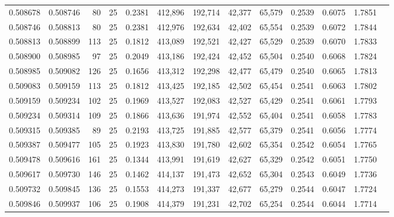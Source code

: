 \begin{tabular}{rrrrrrrrrrrrr}
0.508678 & 0.508746 &    80 &  25 &                                     0.2381 & 412,896 & 192,714 &  42,377 &  65,579 & 0.2539 & 0.6075 & 1.7851 \\
0.508746 & 0.508813 &    80 &  25 &                                     0.2381 & 412,976 & 192,634 &  42,402 &  65,554 & 0.2539 & 0.6072 & 1.7844 \\
0.508813 & 0.508899 &   113 &  25 &                                     0.1812 & 413,089 & 192,521 &  42,427 &  65,529 & 0.2539 & 0.6070 & 1.7833 \\
0.508900 & 0.508985 &    97 &  25 &                                     0.2049 & 413,186 & 192,424 &  42,452 &  65,504 & 0.2540 & 0.6068 & 1.7824 \\
0.508985 & 0.509082 &   126 &  25 &                                     0.1656 & 413,312 & 192,298 &  42,477 &  65,479 & 0.2540 & 0.6065 & 1.7813 \\
0.509083 & 0.509159 &   113 &  25 &                                     0.1812 & 413,425 & 192,185 &  42,502 &  65,454 & 0.2541 & 0.6063 & 1.7802 \\
0.509159 & 0.509234 &   102 &  25 &                                     0.1969 & 413,527 & 192,083 &  42,527 &  65,429 & 0.2541 & 0.6061 & 1.7793 \\
0.509234 & 0.509314 &   109 &  25 &                                     0.1866 & 413,636 & 191,974 &  42,552 &  65,404 & 0.2541 & 0.6058 & 1.7783 \\
0.509315 & 0.509385 &    89 &  25 &                                     0.2193 & 413,725 & 191,885 &  42,577 &  65,379 & 0.2541 & 0.6056 & 1.7774 \\
0.509387 & 0.509477 &   105 &  25 &                                     0.1923 & 413,830 & 191,780 &  42,602 &  65,354 & 0.2542 & 0.6054 & 1.7765 \\
0.509478 & 0.509616 &   161 &  25 &                                     0.1344 & 413,991 & 191,619 &  42,627 &  65,329 & 0.2542 & 0.6051 & 1.7750 \\
0.509617 & 0.509730 &   146 &  25 &                                     0.1462 & 414,137 & 191,473 &  42,652 &  65,304 & 0.2543 & 0.6049 & 1.7736 \\
0.509732 & 0.509845 &   136 &  25 &                                     0.1553 & 414,273 & 191,337 &  42,677 &  65,279 & 0.2544 & 0.6047 & 1.7724 \\
0.509846 & 0.509937 &   106 &  25 &                                     0.1908 & 414,379 & 191,231 &  42,702 &  65,254 & 0.2544 & 0.6044 & 1.7714 \\

\end{tabular}
